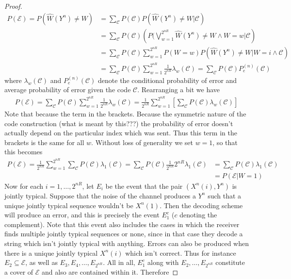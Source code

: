 \documentclass{article}
\theoremstyle{definition}
\theoremstyle{plain}
\begin{document}
\begin{proof}
\begin{align}
	P(\mathcal{E}) = P(\hat{W}(Y^n) \neq W) &= \sum_{\mathcal{C}}P(\mathcal{C})P(\hat{W}(Y^n)\neq W|\mathcal{C}) \\
		&= \sum_{\mathcal{C}}P(\mathcal{C})\left(P(\bigvee_{w=1}^{2^{nR}} \hat{W}(Y^n)\neq W \wedge W=w |\mathcal{C} \right) \\
		&= \sum_{\mathcal{C}}P(\mathcal{C})\sum_{w=1}^{2^{nR}}P(W=w)P(\hat{W}(Y^n)\neq W|W=i \wedge \mathcal{C}) \\
		&= \sum_{\mathcal{C}}P(\mathcal{C})\sum_{w=1}^{2^{nR}}\frac{1}{2^{nR}}\lambda_w(\mathcal{C}) = \sum_{\mathcal{C}}P(\mathcal{C})P_e^{(n)}(\mathcal{C})
\end{align}
where $\lambda_w(\mathcal{C})$ and $P_e^{(n)}(\mathcal{C})$ denote the conditional probability of error and average probability of error given the code $\mathcal{C}$. Rearranging a bit we have
\begin{align}
	P(\mathcal{E}) = \sum_{\mathcal{C}}P(\mathcal{C})\sum_{w=1}^{2^{nR}}\frac{1}{2^{nR}}\lambda_w(\mathcal{C}) = \frac{1}{2^{nR}}\sum_{w=1}^{2^{nR}}\left[ \sum_{\mathcal{C}}P(\mathcal{C})\lambda_w(\mathcal{C}) \right]
\end{align}
Note that because the term in the brackets. Because the symmetric nature of the code construction (what is meant by this???) the probability of error doesn't actually depend on the particular index which was sent. Thus this term in the brackets is the same for all $w$. Without loss of generality we set $w=1$, so that this becomes 
\begin{align}
	P(\mathcal{E}) = \frac{1}{2^{nR}}\sum_{w=1}^{2^{nR}}\sum_{\mathcal{C}}P(\mathcal{C})\lambda_1(\mathcal{C}) = \sum_{\mathcal{C}}P(\mathcal{C})\frac{1}{2^{nR}}2^{nR}\lambda_1(\mathcal{C}) &= \sum_{\mathcal{C}}P(\mathcal{C})\lambda_1(\mathcal{C}) \\
	&= P(\mathcal{E}|W=1)
\end{align}
Now for each $i=1,\ldots,2^{nR}$, let $E_i$ be the event that the pair $(X^n(i),Y^n)$ is jointly typical. Suppose that the noise of the channel produces a $Y^n$ such that a unique jointly typical sequence wouldn't be $X^n(1)$. Then the decoding scheme will produce an error, and this is precisely the event $E_1^c$ ($c$ denoting the complement). Note that this event also includes the cases in which the receiver finds multiple jointly typical sequences or none, since in that case they decode a string which isn't jointly typical with anything. Errors can also be produced when there is a unique jointly typical $X^n(i)$ which isn't correct. Thus for instance $E_2 \subseteq \mathcal{E}$, as well as $E_3,E_4,\ldots,E_{2^{nR}}$. All in all, $E_1^c$ along with $E_2,\ldots,E_{2^{nR}}$ constitute a cover of $\mathcal{E}$ and also are contained within it. Therefore

\end{proof}
\end{document}
